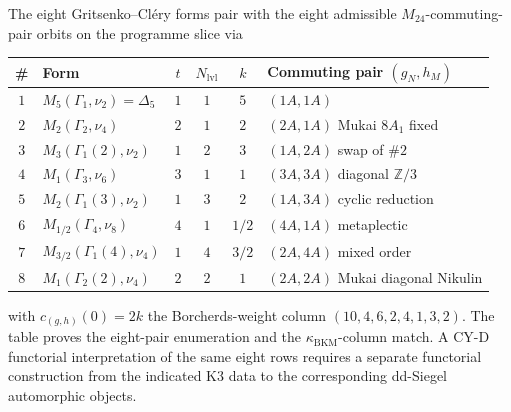 \begin{theorem}
\label{thm:k3e-gc-eight-commuting-pair}
The eight Gritsenko--Cl\'ery forms pair with the eight admissible $M_{24}$-commuting-pair orbits on the programme slice via
\begin{center}
\small
\renewcommand{\arraystretch}{1.15}
\begin{tabular}{c|l|c|c|c|l}
\hline
\# & Form & $t$ & $N_{\mathrm{lvl}}$ & $k$ & Commuting pair $(g_N, h_M)$ \\
\hline
$1$ & $M_5(\Gamma_1, \nu_2) = \Delta_5$ & $1$ & $1$ & $5$ & $(1A, 1A)$ \\
$2$ & $M_2(\Gamma_2, \nu_4)$ & $2$ & $1$ & $2$ & $(2A, 1A)$ Mukai $8 A_1$ fixed \\
$3$ & $M_3(\Gamma_1(2), \nu_2)$ & $1$ & $2$ & $3$ & $(1A, 2A)$ swap of $\#2$ \\
$4$ & $M_1(\Gamma_3, \nu_6)$ & $3$ & $1$ & $1$ & $(3A, 3A)$ diagonal $\mathbb{Z}/3$ \\
$5$ & $M_2(\Gamma_1(3), \nu_2)$ & $1$ & $3$ & $2$ & $(1A, 3A)$ cyclic reduction \\
$6$ & $M_{1/2}(\Gamma_4, \nu_8)$ & $4$ & $1$ & $1/2$ & $(4A, 1A)$ metaplectic \\
$7$ & $M_{3/2}(\Gamma_1(4), \nu_4)$ & $1$ & $4$ & $3/2$ & $(2A, 4A)$ mixed order \\
$8$ & $M_1(\Gamma_2(2), \nu_4)$ & $2$ & $2$ & $1$ & $(2A, 2A)$ Mukai diagonal Nikulin \\
\hline
\end{tabular}
\end{center}
with $c_{(g, h)}(0) = 2 k$ the Borcherds-weight column $(10, 4, 6, 2, 4, 1, 3, 2)$.
The table proves the eight-pair enumeration and the
\(\kappa_{\mathrm{BKM}}\)-column match. A CY-D functorial interpretation
of the same eight rows requires a separate functorial construction from
the indicated K3 data to the corresponding dd-Siegel automorphic
objects.
\end{theorem}

